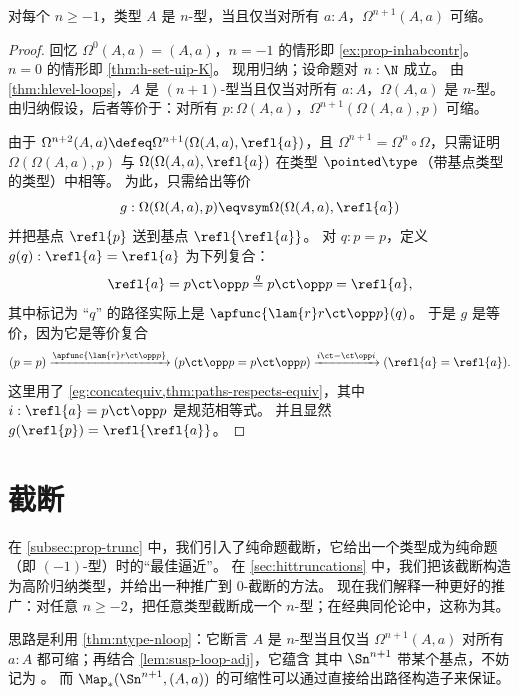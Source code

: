 \begin{thm}\label{thm:ntype-nloop}
  对每个 $n\ge -1$，类型 $A$ 是 $n$-型，当且仅当对所有 $a:A$，$\Omega^{n+1}(A,a)$ 可缩。
\end{thm}
\begin{proof}
  回忆 $\Omega^0(A,a) = (A,a)$，$n=-1$ 的情形即 \cref{ex:prop-inhabcontr}。
  $n=0$ 的情形即 \cref{thm:h-set-uip-K}。
  现用归纳；设命题对 $n:\N$ 成立。
  由 \cref{thm:hlevel-loops}，$A$ 是 $(n+1)$-型当且仅当对所有 $a:A$，$\Omega(A,a)$ 是 $n$-型。
  由归纳假设，后者等价于：对所有 $p:\Omega(A,a)$，$\Omega^{n+1}(\Omega(A,a),p)$ 可缩。

  由于 $\Omega^{n+2}(A,a) \defeq \Omega^{n+1}(\Omega(A,a),\refl{a})$，且 $\Omega^{n+1} = \Omega^n \circ \Omega$，只需证明 $\Omega(\Omega(A,a),p)$ 与 $\Omega(\Omega(A,a),\refl{a})$ 在类型 $\pointed\type$（带基点类型的类型）中相等。
  为此，只需给出等价
  \[ g : \Omega(\Omega(A,a),p) \eqvsym \Omega(\Omega(A,a),\refl{a}) \]
  并把基点 $\refl{p}$ 送到基点 $\refl{\refl{a}}$。
  对 $q:p=p$，定义 $g(q):\refl{a} = \refl{a}$ 为下列复合：
  \[ \refl{a} = p\ct \opp p \overset{q}{=} p\ct\opp p = \refl{a}, \]
  其中标记为 ``$q$'' 的路径实际上是 $\apfunc{\lam{r} r\ct\opp p} (q)$。
  于是 $g$ 是等价，因为它是等价复合
  \[ (p=p) \xrightarrow{\apfunc{\lam{r} r\ct\opp p}} (p\ct \opp p = p\ct \opp p) \xrightarrow{i\ct - \ct \opp i} (\refl{a} = \refl{a}). \]
  这里用了 \cref{eg:concatequiv,thm:paths-respects-equiv}，其中 $i:\refl{a} = p\ct \opp p$ 是规范相等式。
  并且显然 $g(\refl{p}) = \refl{\refl{a}}$。
\end{proof}
\section{截断}
\label{sec:truncations}

%
%

在 \cref{subsec:prop-trunc} 中，我们引入了纯命题截断，它给出一个类型成为纯命题（即 $(-1)$-型）时的“最佳逼近”。
在 \cref{sec:hittruncations} 中，我们把该截断构造为高阶归纳类型，并给出一种推广到
0-截断的方法。
现在我们解释一种更好的推广：对任意 $n\geq -2$，把任意类型截断成一个 $n$-型；在经典同伦论中，这称为其。

思路是利用 \cref{thm:ntype-nloop}：它断言 $A$ 是 $n$-型当且仅当 $\Omega^{n+1}(A,a)$
%
对所有 $a:A$
都可缩；再结合 \cref{lem:susp-loop-adj}，它蕴含
 其中 $\Sn^{n+1}$ 带某个基点，不妨记为 \base。
而 $\Map_*(\Sn^{n+1},(A,a))$ 的可缩性可以通过直接给出路径构造子来保证。

